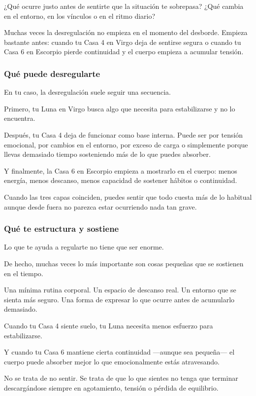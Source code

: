 \documentclass[11pt,a4paper]{article}
\begin{document}
¿Qué ocurre justo antes de sentirte que la situación te sobrepasa?
¿Qué cambia en el entorno, en los vínculos o en el ritmo diario?

Muchas veces la desregulación no empieza en el momento del desborde. Empieza bastante antes: cuando tu Casa 4 en Virgo deja de sentirse segura o cuando tu Casa 6 en Escorpio pierde continuidad y el cuerpo empieza a acumular tensión.

\subsubsection*{Qué puede desregularte}

En tu caso, la desregulación suele seguir una secuencia.

Primero, tu Luna en Virgo busca algo que necesita para estabilizarse y no lo encuentra.

Después, tu Casa 4 deja de funcionar como base interna. Puede ser por tensión emocional, por cambios en el entorno, por exceso de carga o simplemente porque llevas demasiado tiempo sosteniendo más de lo que puedes absorber.

Y finalmente, la Casa 6 en Escorpio empieza a mostrarlo en el cuerpo:
menos energía,
menos descanso,
menos capacidad de sostener hábitos o continuidad.

Cuando las tres capas coinciden, puedes sentir que todo cuesta más de lo habitual aunque desde fuera no parezca estar ocurriendo nada tan grave.

\subsubsection*{Qué te estructura y sostiene}

Lo que te ayuda a regularte no tiene que ser enorme.

De hecho, muchas veces lo más importante son cosas pequeñas que se sostienen en el tiempo.

Una mínima rutina corporal.
Un espacio de descanso real.
Un entorno que se sienta más seguro.
Una forma de expresar lo que ocurre antes de acumularlo demasiado.

Cuando tu Casa 4 siente suelo, tu Luna necesita menos esfuerzo para estabilizarse.

Y cuando tu Casa 6 mantiene cierta continuidad —aunque sea pequeña— el cuerpo puede absorber mejor lo que emocionalmente estás atravesando.

No se trata de no sentir.
Se trata de que lo que sientes no tenga que terminar descargándose siempre en agotamiento, tensión o pérdida de equilibrio.
\end{document}
